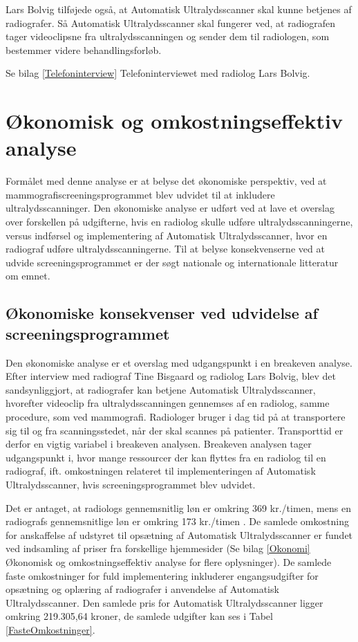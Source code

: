 Lars Bolvig tilføjede også, at Automatisk Ultralydsscanner skal kunne betjenes af radiografer. Så Automatisk Ultralydsscanner skal fungerer ved, at radiografen tager videoclipsne fra ultralydsscanningen og sender dem til radiologen, som bestemmer videre behandlingsforløb.

Se bilag \ref{Telefoninterview} Telefoninterviewet med radiolog Lars Bolvig. 

\section{Økonomisk og omkostningseffektiv analyse}
Formålet med denne analyse er at belyse det økonomiske perspektiv, ved at mammografiscreeningsprogrammet blev udvidet til at inkludere ultralydsscanninger. Den økonomiske analyse er udført ved at lave et overslag over forskellen på udgifterne, hvis en radiolog skulle udføre ultralydsscanningerne, versus indførsel og implementering af Automatisk Ultralydsscanner, hvor en radiograf udføre ultralydsscanningerne. Til at belyse konsekvenserne ved at udvide screeningsprogrammet er der søgt nationale og internationale litteratur om emnet. 

\subsection{Økonomiske konsekvenser ved udvidelse af screeningsprogrammet} 
Den økonomiske analyse er et overslag med udgangspunkt i en breakeven analyse. Efter interview med radiograf Tine Bisgaard og radiolog Lars Bolvig, blev det sandsynliggjort, at radiografer kan betjene Automatisk Ultralydsscanner, hvorefter videoclip fra ultralydsscanningen gennemses af en radiolog, samme procedure, som ved mammografi. 
Radiologer bruger i dag tid på at transportere sig til og fra scanningsstedet, når der skal scannes på patienter. Transporttid er derfor en vigtig variabel i breakeven analysen. Breakeven analysen tager udgangspunkt i, hvor mange ressourcer der kan flyttes fra en radiolog til en radiograf, ift. omkostningen relateret til implementeringen af Automatisk Ultralydsscanner, hvis screeningsprogrammet blev udvidet. 

Det er antaget, at radiologs gennemsnitlig løn er omkring 369 kr./timen, mens en radiografs gennemsnitlige løn er omkring 173 kr./timen \cite{Lon}. De samlede omkostning for anskaffelse af udstyret til opsætning af Automatisk Ultralydsscanner er fundet ved indsamling af priser fra forskellige hjemmesider (Se bilag \ref{Okonomi} Økonomisk og omkostningseffektiv analyse for flere oplysninger). De samlede faste omkostninger for fuld implementering inkluderer engangsudgifter for opsætning og oplæring af radiografer i anvendelse af Automatisk Ultralydsscanner. Den samlede pris for Automatisk Ultralydsscanner ligger omkring 219.305,64 kroner, de samlede udgifter kan ses i Tabel \ref{FasteOmkostninger}. 

